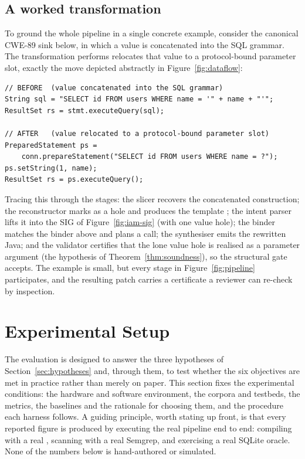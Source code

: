 \subsection{A worked transformation}
\label{sec:worked}

To ground the whole pipeline in a single concrete example, consider the
canonical CWE-89 sink below, in which a value is concatenated into the SQL
grammar. The transformation \irsam{} performs relocates that value to a
protocol-bound parameter slot, exactly the move depicted abstractly in
Figure~\ref{fig:dataflow}:

\begin{verbatim}
// BEFORE  (value concatenated into the SQL grammar)
String sql = "SELECT id FROM users WHERE name = '" + name + "'";
ResultSet rs = stmt.executeQuery(sql);

// AFTER   (value relocated to a protocol-bound parameter slot)
PreparedStatement ps =
    conn.prepareStatement("SELECT id FROM users WHERE name = ?");
ps.setString(1, name);
ResultSet rs = ps.executeQuery();
\end{verbatim}

Tracing this through the stages: the slicer recovers the concatenated
construction; the reconstructor marks  as a hole and produces the
template ; the intent parser lifts
it into the SIG of Figure~\ref{fig:iam-sig} (with one value hole); the
binder matches the  binder above and plans a
 call; the synthesiser emits the rewritten Java; and the
validator certifies that the lone value hole is realised as a parameter
argument (the hypothesis of Theorem~\ref{thm:soundness}), so the structural
gate accepts. The example is small, but every stage in
Figure~\ref{fig:pipeline} participates, and the resulting patch carries a
certificate a reviewer can re-check by inspection.


\section{Experimental Setup}
\label{rem:setup}

The evaluation is designed to answer the three hypotheses of
Section~\ref{sec:hypotheses} and, through them, to test whether the six
objectives are met in practice rather than merely on paper. This section
fixes the experimental conditions: the hardware and software environment,
the corpora and testbeds, the metrics, the baselines and the rationale for
choosing them, and the procedure each harness follows. A guiding principle,
worth stating up front, is that every reported figure is produced by
executing the real pipeline end to end: compiling with a real ,
scanning with a real Semgrep, and exercising a real SQLite oracle. None of
the numbers below is hand-authored or simulated.

